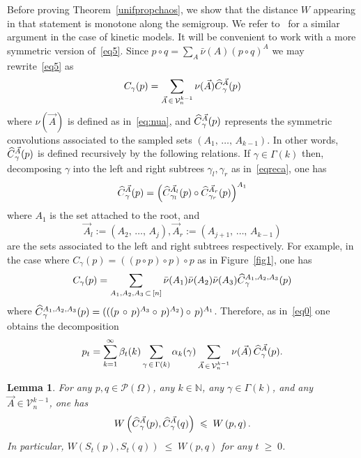 \documentclass[10pt,a4paper]{article}
\newtheorem{lemm}[theorem]{Lemma}
\renewcommand{\leq}{\;\leqslant\;}
\renewcommand{\geq}{\;\geqslant\;}
\newcommand{\cP}{\mathcal{P}}
\newcommand{\cV}{\mathcal{V}}
\newcommand{\bbN}{\mathbb{N}}
\let\b=\beta
\let\g=\gamma
\let\G=\Gamma
\let\O=\Omega
\let\oldhat\hat
\renewcommand*{\hat}[1]{\mathchoice{\widehat{#1}}{\widehat{#1}}{\oldhat{#1}}{\oldhat{#1}}}
\begin{document}
Before proving Theorem~\ref{unifpropchaos}, we show that the distance $W$ appearing in that statement is monotone along the semigroup. We refer to~\cite{tanaka} for a similar argument in the case of kinetic models. It will be convenient to work with a more symmetric version of~\eqref{eq5}. Since $p\circ q = \sum_A \bar\nu(A) (p\circ q)^A$ we may rewrite~\eqref{eq5} as
\begin{align}\label{eq:symme}
C_{\gamma}(p)= \sum_{\vec A\,\in\,\cV_n^{k-1}} \nu(\vec A)
\hat{C}^{\vec A}_{\gamma}(p)
\end{align}
where $\nu(\vec A)$ is defined as in~\eqref{eq:nua}, and $\hat{C}^{\vec A}_{\gamma}(p)$ represents the symmetric convolutions associated to the sampled sets $(A_1,\,\dots,\,A_{k-1})$. In other words, $\hat{C}^{\vec A}_{\gamma}(p)$ is defined recursively by the following relations. If $\gamma \in \Gamma(k)$ then, decomposing $\g$ into the left and right subtrees $\g_l,\g_r$ as in~\eqref{eqreca}, one has
\begin{align}\label{lab:rec}
 \hat{C}^{\vec A}_{\gamma}(p) = \left(\hat{C}^{\vec{A}_{l}}_{\gamma_l}(p)\circ \hat{C}^{\vec{A}_{r}}_{\gamma_r}(p)\right)^{A_1}
\end{align}
where $A_1$ is the set attached to the root, and
\[
\vec{A}_{l} :=\left(A_2,\,\dots,\,A_j\right), \vec{A}_{r} :=\left(A_{j+1},\,\dots,\,A_{k-1}\right)
\]
are the sets associated to the left and right subtrees respectively. For example, in the case where $C_{\gamma}(p) = ((p \circ p)\circ p)\circ p$ as in Figure~\ref{fig1}, one has
\begin{align}
C_{\gamma}(p) = \sum_{A_1,A_2,A_3\,\subset\, [n]}\bar\nu(A_1)\bar \nu(A_2)\bar \nu(A_3)\hat{C}^{A_1,A_2,A_3}_{\gamma}(p)
\end{align}
where $\hat{C}^{A_1,A_2,A_3}_{\gamma}(p) = (((p\, \circ\, p)^{A_3}\circ \,p)^{A_2})\circ\, p)^{A_1}$. Therefore, as in~\eqref{eq0} one obtains the decomposition
\begin{align}\label{eq60}
p_t=\sum_{k=1}^{\infty}\b_t(k)\sum_{\g\,\in \,\Gamma(k)}\alpha_k(\g)\sum_{\vec A\,\in \,\cV_n^{k-1}}\nu(\vec A) \,\hat C^{\vec A}_{\gamma}(p).
\end{align}

\begin{lemm}\label{wasscontrlemma}
For any $p, q \in \cP(\O)$, any $k\in\bbN$, any $\g\in\G(k)$, and any $\vec A\in \cV_n^{k-1}$, one has
\begin{align}\label{eq:mon1}
W\left(\hat C^{\vec A}_{\gamma}(p),\hat C^{\vec A}_{\gamma}(q)\right) \leq W\left(p,q\right).
\end{align}
In particular, $W(S_t(p),S_t(q)) \leq W(p,q)$ for any $t\geq 0$.
\end{lemm}
\end{document}
